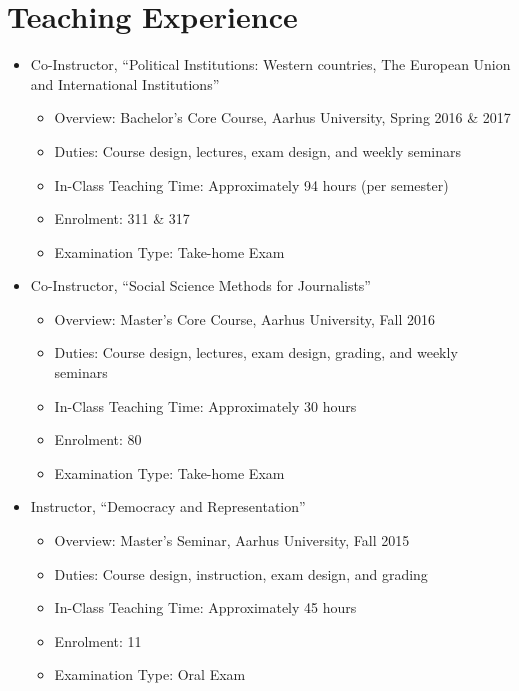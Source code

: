 \documentclass[letterpaper,fontsize=10pt]{scrartcl}
\begin{document}
	\section{Teaching Experience}
	\vspace{-1em}
	\begin{itemize}[noitemsep]
			\item Co-Instructor, “Political Institutions: Western countries, The European Union and International Institutions”\\[-3.5ex]
			\begin{itemize}[noitemsep]
					\item Overview: Bachelor’s Core Course, Aarhus University, Spring 2016 \& 2017
					\item Duties: Course design, lectures, exam design, and weekly seminars
          \item In-Class Teaching Time: Approximately 94 hours (per semester)
          \item Enrolment: 311 \& 317
		  \item Examination Type: Take-home Exam
			\end{itemize}
			\item Co-Instructor, “Social Science Methods for Journalists”\\[-3.5ex]
			\begin{itemize}[noitemsep]
					\item Overview: Master’s Core Course, Aarhus University, Fall 2016
					\item Duties: Course design, lectures, exam design, grading, and weekly seminars
          \item In-Class Teaching Time: Approximately 30 hours
					\item Enrolment: 80
					\item Examination Type: Take-home Exam
				\end{itemize}
			\item Instructor, “Democracy and Representation”\\[-3.5ex]
			\begin{itemize}[noitemsep]
					\item Overview: Master’s Seminar, Aarhus University, Fall 2015
					\item Duties: Course design, instruction, exam design, and grading
          \item In-Class Teaching Time: Approximately 45 hours
					\item Enrolment: 11
					\item Examination Type: Oral Exam

\end{itemize}
\end{itemize}
\end{document}
